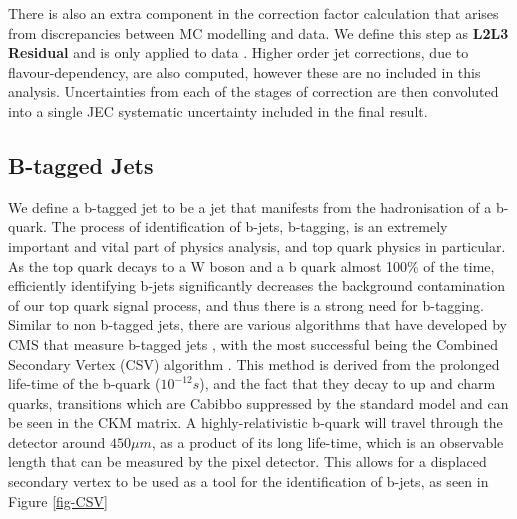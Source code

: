 There is also an extra component in the correction factor calculation that arises from discrepancies between MC modelling and data. We define this step as \textbf{L2L3 Residual} and is only applied to data \cite{1748-0221-6-11-P11002}. Higher order jet corrections, due to flavour-dependency, are also computed, however these are no included in this analysis. Uncertainties from each of the stages of correction are then convoluted into a single JEC systematic uncertainty included in the final result.  

\subsection{B-tagged Jets}

We define a b-tagged jet to be a jet that manifests from the hadronisation of a b-quark. The process of identification of b-jets, b-tagging, is an extremely important and vital part of physics analysis, and top quark physics in particular. As the top quark decays to a W boson and a b quark almost 100\% of the time, efficiently identifying b-jets significantly decreases the background contamination of our top quark signal process, and thus there is a strong need for b-tagging. Similar to non b-tagged jets, there are various algorithms that have developed by CMS that measure b-tagged jets \cite{Chatrchyan:2012jua}, with the most successful being the Combined Secondary Vertex (CSV) algorithm \cite{CSV}. This method is derived from the prolonged life-time of the b-quark ($10^{-12}s$), and the fact that they decay to up and charm quarks, transitions which are Cabibbo suppressed by the standard model and can be seen in the CKM matrix. A highly-relativistic b-quark will travel through the detector around $450 \mu m$, as a product of its long life-time, which is an observable length that can be measured by the pixel detector. This allows for a displaced secondary vertex to be used as a tool for the identification of b-jets, as seen in Figure \ref{fig-CSV}

